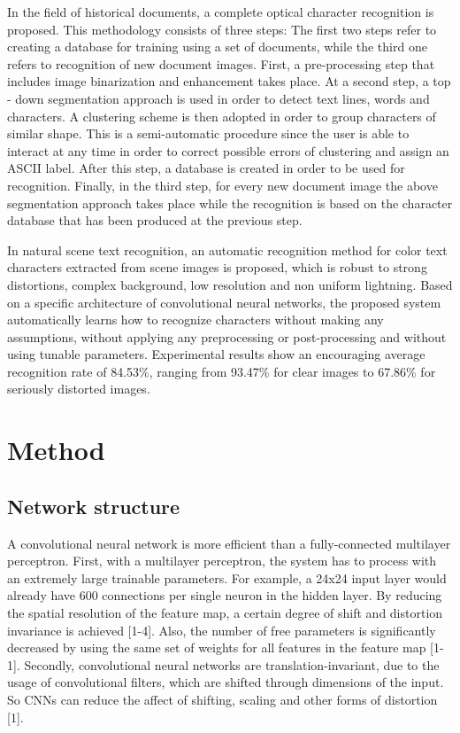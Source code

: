 \documentclass[10pt,twocolumn,letterpaper]{article}
\begin{document}
In the field of historical documents, a complete optical character recognition is proposed. This methodology consists of three steps: The first two steps refer to creating a database for training using a set of documents, while the third one refers to recognition of new document images. First, a pre-processing step that includes image binarization and enhancement takes place. At a second step, a top - down segmentation approach is used in order to detect text lines, words and characters. A clustering scheme is then adopted in order to group characters of similar shape. This is a semi-automatic procedure since the user is able to interact at any time in order to correct possible errors of clustering and assign an ASCII label. After this step, a database is created in order to be used for recognition. Finally, in the third step, for every new document image the above segmentation approach takes place while the recognition is based on the character database that has been produced at the previous step.

In natural scene text recognition, an automatic recognition method for color text characters extracted from scene images is proposed, which is robust to strong distortions, complex background, low resolution and non uniform lightning. Based on a specific architecture of convolutional neural networks, the proposed system automatically learns how to recognize characters without making any assumptions, without applying any preprocessing or post-processing and without using tunable parameters. Experimental results show an encouraging average recognition rate of 84.53\%, ranging from 93.47\% for clear images to 67.86\% for seriously distorted images.

\section{Method}

\subsection{Network structure}
A convolutional neural network is more efficient than a fully-connected multilayer perceptron. First, with a multilayer perceptron, the system has to process with an extremely large trainable parameters. For example, a 24x24 input layer would already have 600 connections per single neuron in the hidden layer. By reducing the spatial resolution of the feature map, a certain degree of shift and distortion invariance is achieved [1-4]. Also, the number of free parameters is significantly decreased by using the same set of weights for all features in the feature map [1-1].  Secondly, convolutional neural networks are translation-invariant, due to the usage of convolutional filters, which are shifted through dimensions of the input. So CNNs can reduce the affect of shifting, scaling and other forms of distortion [1].
\end{document}
